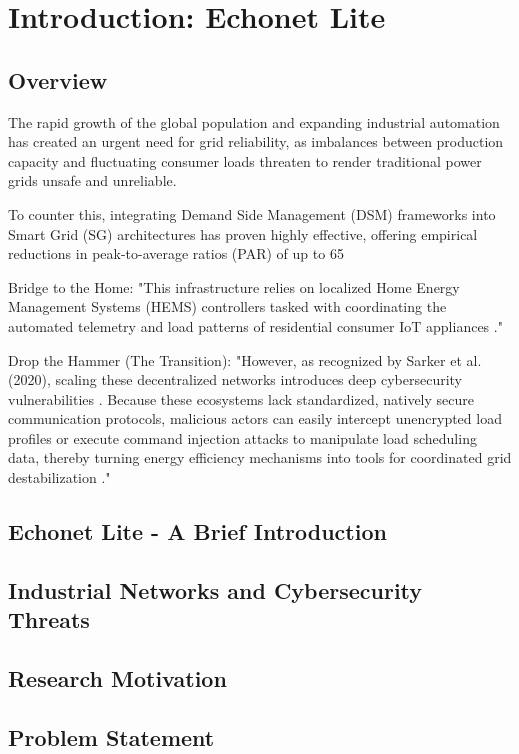 \chapter{Introduction: Echonet Lite}\label{chap:intro}


\section{Overview}
The rapid growth of the global population and expanding industrial automation has created an urgent need for grid reliability, as imbalances between production capacity and fluctuating consumer loads threaten to render traditional power grids unsafe and unreliable.

To counter this, integrating Demand Side Management (DSM) frameworks into Smart Grid (SG) architectures has proven highly effective, offering empirical reductions in peak-to-average ratios (PAR) of up to 65%

Bridge to the Home: "This infrastructure relies on localized Home Energy Management Systems (HEMS) controllers tasked with coordinating the automated telemetry and load patterns of residential consumer IoT appliances ."

Drop the Hammer (The Transition): "However, as recognized by Sarker et al. (2020), scaling these decentralized networks introduces deep cybersecurity vulnerabilities . Because these ecosystems lack standardized, natively secure communication protocols, malicious actors can easily intercept unencrypted load profiles or execute command injection attacks to manipulate load scheduling data, thereby turning energy efficiency mechanisms into tools for coordinated grid destabilization ."\citep{sarker2021progress}



\section{Echonet Lite - A Brief Introduction}
\section{Industrial Networks and Cybersecurity Threats
 }
\section{Research Motivation}
\section{Problem Statement}
